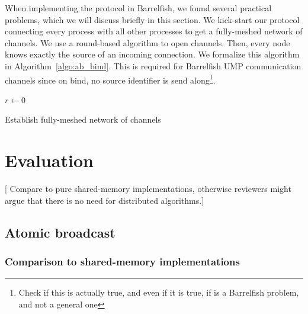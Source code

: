 \documentclass{article}
\newcommand{\stefan}[1]{
  {\color{skRed}[{\color{red}{SK}} #1]}}
\begin{document}
When implementing the protocol in Barrelfish, we found several
practical problems, which we will discuss briefly in this section.
We kick-start our protocol connecting every process with all other
processes to get a fully-meshed network of channels.
We use a round-based algorithm to open channels. Then, every node
knows exactly the source of an incoming connection. We formalize this
algorithm in Algorithm~\ref{algo:ab_bind}.
This is required for Barrelfish UMP communication channels since on
bind, no source identifier is send along\footnote{Check if this is
  actually true, and even if it is true, if is a Barrelfish problem,
  and not a general one}.

\begin{algorithm}[htb]
  \BlankLine
  \BlankLine
  $r \leftarrow 0$\;
  \caption{Establish fully-meshed network of channels}
  \label{algo:ab_bind}
\end{algorithm}

\section{Evaluation}

\stefan{Compare to pure shared-memory implementations, otherwise
  reviewers might argue that there is no need for distributed
  algorithms.}

\subsection{Atomic broadcast}



\subsubsection{Comparison to shared-memory implementations}
\end{document}
